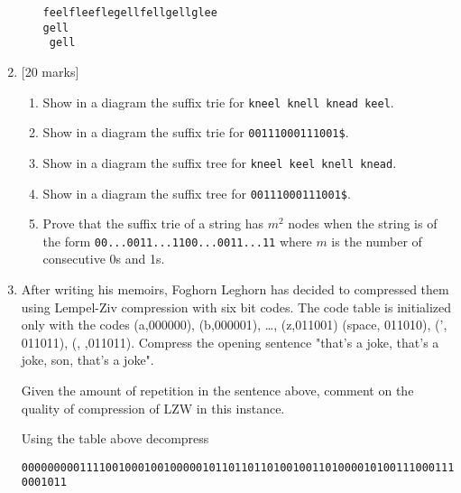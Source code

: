 \documentclass[11pt]{article}
\begin{document}
\begin{enumerate}
\begin{enumerate}
\begin{verbatim}
feelfleeflegellfellgellglee
gell
 gell
\end{verbatim}
\end{enumerate}

\item {[20 marks]}

\begin{enumerate}
\item
	 Show in a diagram the suffix trie for \verb+kneel knell knead keel+.
\item
	 Show in a diagram the suffix trie for \verb+00111000111001$+.
\item
	 Show in a diagram the suffix tree for \verb+kneel keel knell knead+.
\item
	 Show in a diagram the suffix tree for  \verb+00111000111001$+.
\item
 Prove that the suffix trie of a string has $m^2$ nodes when the string is of the form \verb+00...0011...1100...0011...11+ where $m$ is the number of consecutive 0s and 1s.
\end{enumerate}

\item After writing his memoirs, Foghorn Leghorn has decided to compressed them using
      Lempel-Ziv compression with six bit codes.  The code table is initialized only with the codes (a,000000), (b,000001), \ldots, (z,011001) (space, 011010), (', 011011), (, ,011011).  Compress the opening sentence "that's a joke, that's a joke, son, that's a joke".
      
      Given the amount of repetition in the sentence above, comment on the quality of
      compression of LZW in this instance. 
      
      Using the table above decompress 
      
      {\tt 00000000011110010001001000001011011011010010011010000101001110001110001011}
 
\end{enumerate}
\end{document}
